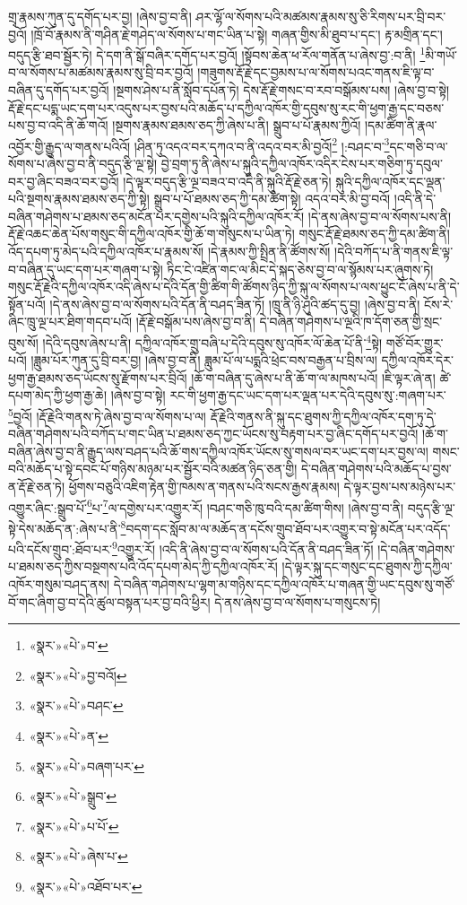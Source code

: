 གྲྭ་རྣམས་ཀུན་དུ་དགོད་པར་བྱ། །ཞེས་བྱ་བ་ནི། ཤར་ལྷོ་ལ་སོགས་པའི་མཚམས་རྣམས་སུ་ཅི་རིགས་པར་བྲི་བར་བྱའོ། །ཁྲོ་བོ་རྣམས་ནི་གཤིན་རྗེ་གཤེད་ལ་སོགས་པ་གང་ཡིན་པ་སྟེ། གཞན་གྱིས་མི་ཐུབ་པ་དང་། རྟ་མགྲིན་དང་། བདུད་རྩི་ཐབ་སྦྱོར་ཏེ། དེ་དག་ནི་སྒོ་བཞིར་དགོད་པར་བྱའོ། །སྟོབས་ཆེན་ཕ་རོལ་གནོན་པ་ཞེས་བྱ་:བ་ནི། \footnote{«སྣར་»«པེ་»བ་}མི་གཡོ་བ་ལ་སོགས་པ་མཚམས་རྣམས་སུ་བྲི་བར་བྱའོ། །གཟུགས་རྡོ་རྗེ་དང་བྱམས་པ་ལ་སོགས་པའང་གནས་ཇི་ལྟ་བ་བཞིན་དུ་དགོད་པར་བྱའོ། །སྔགས་ཤེས་པ་ནི་སློབ་དཔོན་ཏེ། དེས་རྡོ་རྗེ་གསང་བ་རབ་བསྒོམས་པས། །ཞེས་བྱ་བ་སྟེ། རྡོ་རྗེ་དང་པདྨ་ཡང་དག་པར་འདུས་པར་བྱས་པའི་མཆོད་པ་དཀྱིལ་འཁོར་གྱི་དབུས་སུ་རང་གི་ཕྱག་རྒྱ་དང་བཅས་པས་བྱ་བ་འདི་ནི་ཆོ་གའོ། །སྔགས་རྣམས་ཐམས་ཅད་ཀྱི་ཞེས་པ་ནི། སྒྲུབ་པ་པོ་རྣམས་ཀྱིའོ། །དམ་ཚིག་ནི་རྣལ་འབྱོར་གྱི་རྒྱུད་ལ་གནས་པའིའོ། །ཤིན་ཏུ་འདའ་བར་དཀའ་བ་ནི་འདའ་བར་མི་བྱའོ།\footnote{«སྣར་»«པེ་»བྱ་བའོ།} །:བཤང་བ་\footnote{«སྣར་»«པེ་»བཤང་}དང་གཅི་བ་ལ་སོགས་པ་ཞེས་བྱ་བ་ནི་བདུད་རྩི་ལྔ་སྟེ། བྱེ་བྲག་ཏུ་ནི་ཞེས་པ་སྐུའི་དཀྱིལ་འཁོར་འདིར་ངེས་པར་གཅིག་ཏུ་དབུལ་བར་བྱ་ཞིང་བཟའ་བར་བྱའོ། །དེ་ལྟར་བདུད་རྩི་ལྔ་བཟའ་བ་འདི་ནི་སྐུའི་རྡོ་རྗེ་ཅན་ཏེ། སྐུའི་དཀྱིལ་འཁོར་དང་ལྡན་པའི་སྔགས་རྣམས་ཐམས་ཅད་ཀྱི་སྟེ། སྒྲུབ་པ་པོ་ཐམས་ཅད་ཀྱི་དམ་ཚིག་སྟེ། འདའ་བར་མི་བྱ་བའོ། །འདི་ནི་དེ་བཞིན་གཤེགས་པ་ཐམས་ཅད་མངོན་པར་དགྱེས་པའི་སྐུའི་དཀྱིལ་འཁོར་རོ། །དེ་ནས་ཞེས་བྱ་བ་ལ་སོགས་པས་ནི། རྡོ་རྗེ་འཆང་ཆེན་པོས་གསུང་གི་དཀྱིལ་འཁོར་གྱི་ཆོ་ག་གསུངས་པ་ཡིན་ཏེ། གསུང་རྡོ་རྗེ་ཐམས་ཅད་ཀྱི་དམ་ཚིག་ནི། འོད་དཔག་ཏུ་མེད་པའི་དཀྱིལ་འཁོར་པ་རྣམས་སོ། །དེ་རྣམས་ཀྱི་སྤྲིན་ནི་ཚོགས་སོ། །དེའི་བཀོད་པ་ནི་གནས་ཇི་ལྟ་བ་བཞིན་དུ་ཡང་དག་པར་གཞག་པ་སྟེ། ཏིང་ངེ་འཛིན་གང་ལ་མིང་དེ་སྐད་ཅེས་བྱ་བ་ལ་སྙོམས་པར་ཞུགས་ཏེ། གསུང་རྡོ་རྗེའི་དཀྱིལ་འཁོར་འདི་ཞེས་པ་དེའི་དོན་གྱི་ཚིག་གི་ཚོགས་ཉིད་ཀྱི་སྐུ་ལ་སོགས་པ་ལས་ཕྱུང་ངོ་ཞེས་པ་ནི་དེ་སྟོན་པའོ། །དེ་ནས་ཞེས་བྱ་བ་ལ་སོགས་པའི་དོན་ནི་བཤད་ཟིན་ཏོ། །ཁྲུ་ནི་ཉི་ཤུའི་ཚད་དུ་བྱ། །ཞེས་བྱ་བ་ནི། ངོས་རེ་ཞིང་ཁྲུ་ལྔ་པར་ཐིག་གདབ་པའོ། །རྡོ་རྗེ་བསྒོམ་པས་ཞེས་བྱ་བ་ནི། དེ་བཞིན་གཤེགས་པ་ལྔའི་ཁ་དོག་ཅན་གྱི་སྲང་བུས་སོ། །དེའི་དབུས་ཞེས་པ་ནི། དཀྱིལ་འཁོར་གྲུ་བཞི་པ་དེའི་དབུས་སུ་འཁོར་ལོ་ཆེན་པོ་ནི་\footnote{«སྣར་»«པེ་»ན་}སྟེ། གཙོ་བོར་གྱུར་པའོ། །ཟླུམ་པོར་ཀུན་དུ་བྲི་བར་བྱ། །ཞེས་བྱ་བ་ནི། ཟླུམ་པོ་ལ་པདྨའི་ཕྲེང་བས་བརྒྱན་པ་བྲིས་ལ། དཀྱིལ་འཁོར་དེར་ཕྱག་རྒྱ་ཐམས་ཅད་ཡོངས་སུ་རྫོགས་པར་བྲིའོ། །ཆོ་ག་བཞིན་དུ་ཞེས་པ་ནི་ཆོ་ག་ལ་མཁས་པའོ། །ཇི་ལྟར་ཞེ་ན། ཚེ་དཔག་མེད་ཀྱི་ཕྱག་རྒྱ་ཆེ། །ཞེས་བྱ་བ་སྟེ། རང་གི་ཕྱག་རྒྱ་དང་ཡང་དག་པར་ལྡན་པར་དེའི་དབུས་སུ་:གཞག་པར་\footnote{«སྣར་»«པེ་»བཞག་པར་}བྱའོ། །རྡོ་རྗེའི་གནས་ཏེ་ཞེས་བྱ་བ་ལ་སོགས་པ་ལ། རྡོ་རྗེའི་གནས་ནི་སྐུ་དང་ཐུགས་ཀྱི་དཀྱིལ་འཁོར་དག་ཏུ་དེ་བཞིན་གཤེགས་པའི་བཀོད་པ་གང་ཡིན་པ་ཐམས་ཅད་ཀྱང་ཡོངས་སུ་བརྟག་པར་བྱ་ཞིང་དགོད་པར་བྱའོ། །ཆོ་ག་བཞིན་ཞེས་བྱ་བ་ནི་རྒྱུད་ལས་བཤད་པའི་ཆོ་གས་དཀྱིལ་འཁོར་ཡོངས་སུ་གསལ་བར་ཡང་དག་པར་བྱས་ལ། གསང་བའི་མཆོད་པ་སྟེ་དབང་པོ་གཉིས་མཉམ་པར་སྦྱོར་བའི་མཚན་ཉིད་ཅན་གྱི། དེ་བཞིན་གཤེགས་པའི་མཆོད་པ་བྱས་ན་རྡོ་རྗེ་ཅན་ཏེ། ཕྱོགས་བཅུའི་འཇིག་རྟེན་གྱི་ཁམས་ན་གནས་པའི་སངས་རྒྱས་རྣམས། དེ་ལྟར་བྱས་པས་མཉེས་པར་འགྱུར་ཞིང་:སྒྲུབ་པོ་\footnote{«སྣར་»«པེ་»སྒྲུབ་}པ་\footnote{«སྣར་»«པེ་»པ་པོ་}ལ་དགྱེས་པར་འགྱུར་རོ། །བཤང་གཅི་ཁུ་བའི་དམ་ཚིག་གིས། །ཞེས་བྱ་བ་ནི། བདུད་རྩི་ལྔ་སྟེ་དེས་མཆོད་ན་:ཞེས་པ་ནི་\footnote{«སྣར་»«པེ་»ཞེས་པ་}བདག་དང་སློབ་མ་ལ་མཆོད་ན་དངོས་གྲུབ་ཐོབ་པར་འགྱུར་བ་སྟེ་མངོན་པར་འདོད་པའི་དངོས་གྲུབ་:ཐོབ་པར་\footnote{«སྣར་»«པེ་»འཐོབ་པར་}འགྱུར་རོ། །འདི་ནི་ཞེས་བྱ་བ་ལ་སོགས་པའི་དོན་ནི་བཤད་ཟིན་ཏོ། །དེ་བཞིན་གཤེགས་པ་ཐམས་ཅད་ཀྱིས་བསྔགས་པའི་འོད་དཔག་མེད་ཀྱི་དཀྱིལ་འཁོར་རོ། །དེ་ལྟར་སྐུ་དང་གསུང་དང་ཐུགས་ཀྱི་དཀྱིལ་འཁོར་གསུམ་བཤད་ནས། དེ་བཞིན་གཤེགས་པ་ལྷག་མ་གཉིས་དང་དཀྱིལ་འཁོར་པ་གཞན་གྱི་ཡང་དབུས་སུ་གཙོ་བོ་གང་ཞིག་བྱ་བ་དེའི་ཚུལ་བསྟན་པར་བྱ་བའི་ཕྱིར། དེ་ནས་ཞེས་བྱ་བ་ལ་སོགས་པ་གསུངས་ཏེ། 